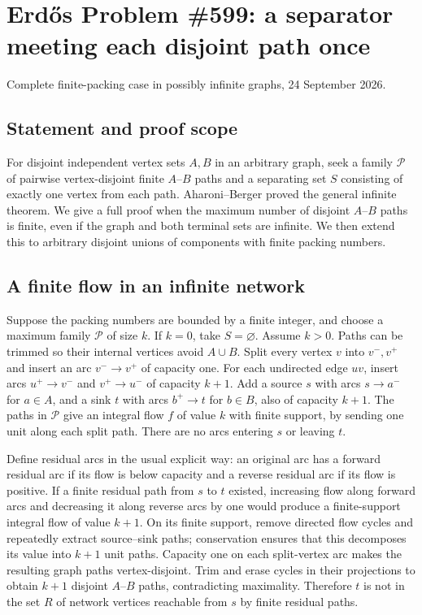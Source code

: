 \section{Erd\H{o}s Problem \#599: a separator meeting each disjoint path once}
\noindent Complete finite-packing case in possibly infinite graphs, 24 September 2026.

\subsection*{Statement and proof scope}
For disjoint independent vertex sets $A,B$ in an arbitrary graph, seek a family $\mathcal P$ of pairwise vertex-disjoint finite $A$--$B$ paths and a separating set $S$ consisting of exactly one vertex from each path. Aharoni--Berger proved the general infinite theorem. We give a full proof when the maximum number of disjoint $A$--$B$ paths is finite, even if the graph and both terminal sets are infinite. We then extend this to arbitrary disjoint unions of components with finite packing numbers.

\subsection*{A finite flow in an infinite network}
Suppose the packing numbers are bounded by a finite integer, and choose a maximum family $\mathcal P$ of size $k$. If $k=0$, take $S=\varnothing$. Assume $k>0$. Paths can be trimmed so their internal vertices avoid $A\cup B$.
Split every vertex $v$ into $v^-,v^+$ and insert an arc $v^-\to v^+$ of capacity one. For each undirected edge $uv$, insert arcs $u^+\to v^-$ and $v^+\to u^-$ of capacity $k+1$. Add a source $s$ with arcs $s\to a^-$ for $a\in A$, and a sink $t$ with arcs $b^+\to t$ for $b\in B$, also of capacity $k+1$.
The paths in $\mathcal P$ give an integral flow $f$ of value $k$ with finite support, by sending one unit along each split path. There are no arcs entering $s$ or leaving $t$.

Define residual arcs in the usual explicit way: an original arc has a forward residual arc if its flow is below capacity and a reverse residual arc if its flow is positive. If a finite residual path from $s$ to $t$ existed, increasing flow along forward arcs and decreasing it along reverse arcs by one would produce a finite-support integral flow of value $k+1$. On its finite support, remove directed flow cycles and repeatedly extract source--sink paths; conservation ensures that this decomposes its value into $k+1$ unit paths. Capacity one on each split-vertex arc makes the resulting graph paths vertex-disjoint. Trim and erase cycles in their projections to obtain $k+1$ disjoint $A$--$B$ paths, contradicting maximality.
Therefore $t$ is not in the set $R$ of network vertices reachable from $s$ by finite residual paths.

